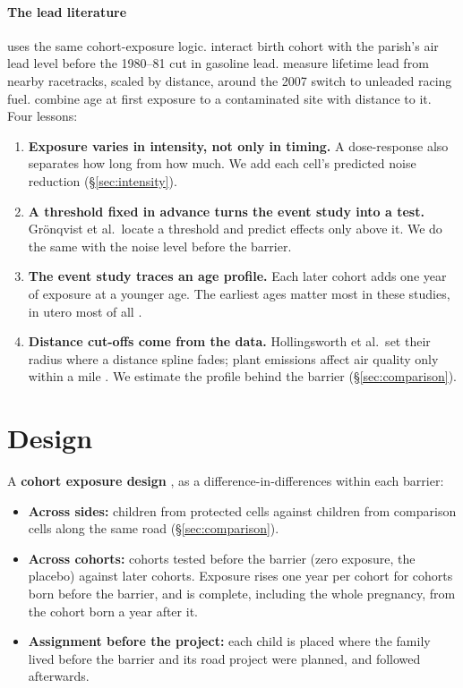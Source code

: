 \documentclass[11pt]{article}
\begin{document}
\paragraph{The lead literature} uses the same cohort-exposure logic.
\textcite{gronqvistUnderstandingHowLow2020} interact birth cohort with the parish's air lead
level before the 1980--81 cut in gasoline lead. \textcite{hollingsworthThousandCutsCumulative2025}
measure lifetime lead from nearby racetracks, scaled by distance, around the 2007 switch to
unleaded racing fuel. \textcite{berkhoutLeadExposureCognitive2025} combine age at first exposure
to a contaminated site with distance to it. Four lessons:
\begin{enumerate}
\item \textbf{Exposure varies in intensity, not only in timing.} A dose-response also separates
  how long from how much. We add each cell's predicted noise reduction (\S\ref{sec:intensity}).
\item \textbf{A threshold fixed in advance turns the event study into a test.} Grönqvist et al.\
  locate a threshold and predict effects only above it. We do the same with the noise level
  before the barrier.
\item \textbf{The event study traces an age profile.} Each later cohort adds one year of
  exposure at a younger age. The earliest ages matter most in these studies, in utero most of
  all \autocite{berkhoutLeadExposureCognitive2025}.
\item \textbf{Distance cut-offs come from the data.} Hollingsworth et al.\ set their radius where
  a distance spline fades; plant emissions affect air quality only within a mile
  \autocite{currieEnvironmentalHealthRisks2015}. We estimate the profile behind the barrier
  (\S\ref{sec:comparison}).
\end{enumerate}

\section{Design}\label{sec:design}

A \textbf{cohort exposure design} \autocite{dufloSchoolingLaborMarket2001}, as a
difference-in-differences within each barrier:
\begin{itemize}
\item \textbf{Across sides:} children from protected cells against children from comparison
  cells along the same road (\S\ref{sec:comparison}).
\item \textbf{Across cohorts:} cohorts tested before the barrier (zero exposure, the placebo)
  against later cohorts. Exposure rises one year per cohort for cohorts born before the
  barrier, and is complete, including the whole pregnancy, from the cohort born a year after
  it.
\item \textbf{Assignment before the project:} each child is placed where the family lived
  before the barrier and its road project were planned, and followed afterwards.
\end{itemize}
\end{document}
